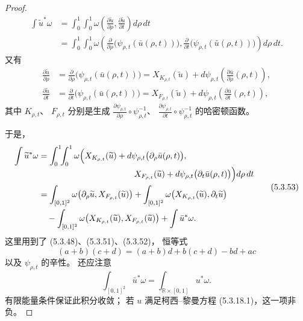 \begin{proof}
\begin{equation}
\begin{aligned}
\int\widetilde u^*\omega
&=\int_0^1\!\!\int_0^1
\omega\!\left(
\frac{\partial\widetilde u}{\partial\rho},
\frac{\partial\widetilde u}{\partial t}
\right)d\rho\,dt
\\
&=\int_0^1\!\!\int_0^1
\omega\!\left(
\frac{\partial}{\partial\rho}
\bigl(\psi_{\rho,t}(\bar u(\rho,t))\bigr),
\frac{\partial}{\partial t}
\bigl(\psi_{\rho,t}(\bar u(\rho,t))\bigr)
\right)d\rho\,dt.
\end{aligned}
\tag{5.3.51}\label{eq:5-3-51}
\end{equation}
又有
\begin{equation}
\begin{aligned}
\frac{\partial\widetilde u}{\partial\rho}
&=
\frac{\partial}{\partial\rho}
\bigl(\psi_{\rho,t}(\bar u(\rho,t))\bigr)
=X_{K_{\rho,t}}(\widetilde u)
+d\psi_{\rho,t}
\left(\frac{\partial\bar u}{\partial\rho}
(\rho,t)\right),
\\
\frac{\partial\widetilde u}{\partial t}
&=
\frac{\partial}{\partial t}
\bigl(\psi_{\rho,t}(\bar u(\rho,t))\bigr)
=X_{F_{\rho,t}}(\widetilde u)
+d\psi_{\rho,t}
\left(\frac{\partial\bar u}{\partial t}
(\rho,t)\right),
\end{aligned}
\tag{5.3.52}\label{eq:5-3-52}
\end{equation}
其中 $K_{\rho,t}$、
$F_{\rho,t}$ 分别是生成
$\frac{\partial\psi_{\rho,t}}{\partial\rho}
\circ\psi_{\rho,t}^{-1}$、
$\frac{\partial\psi_{\rho,t}}{\partial t}
\circ\psi_{\rho,t}^{-1}$
的哈密顿函数。

于是，
\begin{equation}
\begin{aligned}
\int\widetilde u^*\omega
&=\int_0^1\!\!\int_0^1
\omega\Bigl(
X_{K_{\rho,t}}(\widetilde u)
+d\psi_{\rho,t}
\bigl(\partial_\rho\bar u(\rho,t)\bigr),
\\[-1mm]
&\hspace{40mm}
X_{F_{\rho,t}}(\widetilde u)
+d\psi_{\rho,t}
\bigl(\partial_t\bar u(\rho,t)\bigr)
\Bigr)d\rho\,dt
\\
&=\int_{[0,1]^2}
\omega\!\left(
\partial_\rho\widetilde u,
X_{F_{\rho,t}}(\widetilde u)
\right)
+\int_{[0,1]^2}
\omega\!\left(
X_{K_{\rho,t}}(\widetilde u),
\partial_t\widetilde u
\right)
\\
&\quad-
\int_{[0,1]^2}
\omega\!\left(
X_{K_{\rho,t}}(\widetilde u),
X_{F_{\rho,t}}(\widetilde u)
\right)
+\int\bar u^*\omega.
\end{aligned}
\tag{5.3.53}\label{eq:5-3-53}
\end{equation}
这里用到了
(5.3.48)、(5.3.51)、(5.3.52)，
恒等式
\[
(a+b)(c+d)
=(a+b)d+b(c+d)-bd+ac
\]
以及 $\psi_{\rho,t}$ 的辛性。
还应注意
\[
\int_{[0,1]^2}\bar u^*\omega
=\int_{\mathbb R\times[0,1]}u^*\omega.
\]
有限能量条件保证此积分收敛；
若 $u$ 满足柯西--黎曼方程
(5.3.18.1)，这一项非负。


\end{proof}
